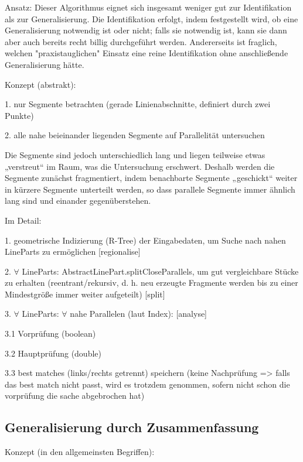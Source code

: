 \documentclass[../main/thesis.tex]{subfiles}
\begin{document}
Ansatz: Dieser Algorithmus eignet sich insgesamt weniger gut zur Identifikation als zur Generalisierung. Die Identifikation erfolgt, indem festgestellt wird, ob eine Generalisierung notwendig ist oder nicht; falls sie notwendig ist, kann sie dann aber auch bereits recht billig durchgeführt werden. Andererseits ist fraglich, welchen "praxistauglichen" Einsatz eine reine Identifikation ohne anschließende Generalisierung hätte.

Konzept (abstrakt):

1. nur Segmente betrachten (gerade Linienabschnitte, definiert durch zwei Punkte)

2. alle nahe beieinander liegenden Segmente auf Parallelität untersuchen

Die Segmente sind jedoch unterschiedlich lang und liegen teilweise etwas „verstreut“ im Raum, was die Untersuchung erschwert.
Deshalb werden die Segmente zunächst fragmentiert, indem benachbarte Segmente „geschickt“ weiter in kürzere Segmente unterteilt werden, so dass parallele Segmente immer ähnlich lang sind und einander gegenüberstehen.

Im Detail:

1. geometrische Indizierung (R-Tree) der Eingabedaten, um Suche nach nahen LineParts zu ermöglichen [regionalise]

2. $\forall$ LineParts: AbstractLinePart.splitCloseParallels, um gut vergleichbare Stücke zu erhalten (reentrant/rekursiv, d. h. neu erzeugte Fragmente werden bis zu einer Mindestgröße immer weiter aufgeteilt) [split]

3. $\forall$ LineParts: $\forall$ nahe Parallelen (laut Index): [analyse]

3.1 Vorprüfung (boolean)

3.2 Hauptprüfung (double)

3.3 best matches (links/rechts getrennt) speichern (keine Nachprüfung => falls das best match nicht passt, wird es trotzdem genommen, sofern nicht schon die vorprüfung die sache abgebrochen hat)



\subsection{Generalisierung durch Zusammenfassung}

Konzept (in den allgemeinsten Begriffen):
\end{document}
